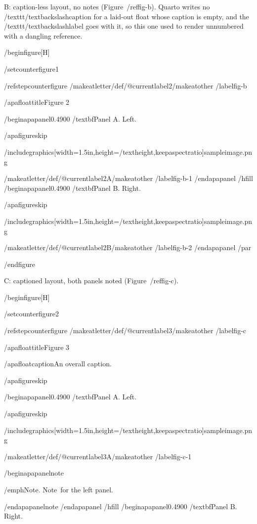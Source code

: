 B: caption-less layout, no notes (Figure~/ref{fig-b}). Quarto writes no
/texttt{/textbackslash{}caption} for a laid-out float whose caption is
empty, and the /texttt{/textbackslash{}label} goes with it, so this one
used to render unnumbered with a dangling reference.

/begin{figure}[H]

/setcounter{figure}{1}

/refstepcounter{figure}%
/makeatletter/def/@currentlabel{2}/makeatother%
/label{fig-b}

/apafloattitle{Figure 2}

/begin{apapanel}{0.4900}%
/textbf{Panel A}. Left.

/apafigureskip

/includegraphics[width=1.5in,height=/textheight,keepaspectratio]{sampleimage.png}

/makeatletter/def/@currentlabel{2A}/makeatother%
/label{fig-b-1}
/end{apapanel}%
/hfill
/begin{apapanel}{0.4900}%
/textbf{Panel B}. Right.

/apafigureskip

/includegraphics[width=1.5in,height=/textheight,keepaspectratio]{sampleimage.png}

/makeatletter/def/@currentlabel{2B}/makeatother%
/label{fig-b-2}
/end{apapanel}%
/par

/end{figure}

C: captioned layout, both panels noted (Figure~/ref{fig-c}).

/begin{figure}[H]

/setcounter{figure}{2}

/refstepcounter{figure}%
/makeatletter/def/@currentlabel{3}/makeatother%
/label{fig-c}

/apafloattitle{Figure 3}

/apafloatcaption{An overall caption.}

/apafigureskip

/begin{apapanel}{0.4900}%
/textbf{Panel A}. Left.

/apafigureskip

/includegraphics[width=1.5in,height=/textheight,keepaspectratio]{sampleimage.png}

/makeatletter/def/@currentlabel{3A}/makeatother%
/label{fig-c-1}

/begin{apapanelnote}

/emph{Note}. Note~for the left panel.

/end{apapanelnote}
/end{apapanel}%
/hfill
/begin{apapanel}{0.4900}%
/textbf{Panel B}. Right.

